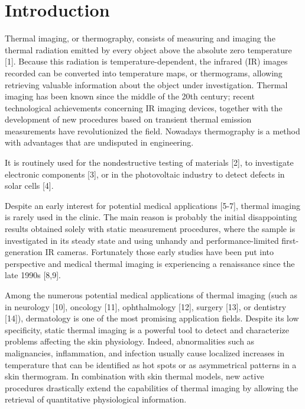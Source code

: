 
\section*{Introduction}

Thermal imaging, or thermography, consists of measuring and imaging the thermal radiation
emitted by every object above the absolute zero temperature [1]. Because this radiation is
temperature-dependent, the infrared (IR) images recorded can be converted into temperature
maps, or thermograms, allowing retrieving valuable information about the object under
investigation. Thermal imaging has been known since the middle of the 20th century; recent
technological achievements concerning IR imaging devices, together with the development of
new procedures based on transient thermal emission measurements have revolutionized the
field. Nowadays thermography is a method with advantages that are undisputed in engineering.

It is routinely used for the nondestructive testing of materials [2], to investigate
electronic components [3], or in the photovoltaic industry to detect defects in solar
cells [4].

Despite an early interest for potential medical applications [5-7], thermal imaging is
rarely used in the clinic. The main reason is probably the initial disappointing results
obtained solely with static measurement procedures, where the sample is investigated in
its steady state and using unhandy and performance-limited first-generation IR cameras.
Fortunately those early studies have been put into perspective and medical thermal
imaging is experiencing a renaissance since the late 1990s [8,9].

Among the numerous potential medical applications of thermal imaging (such as in
neurology [10], oncology [11], ophthalmology [12], surgery [13], or dentistry [14]),
dermatology is one of the most promising application fields. Despite its low specificity,
static thermal imaging is a powerful tool to detect and characterize problems affecting
the skin physiology. Indeed, abnormalities such as malignancies, inflammation, and
infection usually cause localized increases in temperature that can be identified as hot
spots or as asymmetrical patterns in a skin thermogram. In combination with skin thermal
models, new active procedures drastically extend the capabilities of thermal imaging by
allowing the retrieval of quantitative physiological information.

